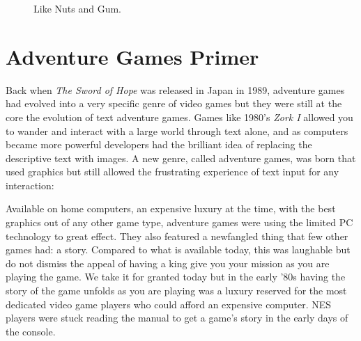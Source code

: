 \documentclass{book}
\begin{document}
\FloatBarrier\vspace{\baselineskip}\begin{figure}[H]\caption*{Like Nuts and Gum.}\end{figure}
\FloatBarrier\section*{Adventure Games Primer}
Back when \emph{The Sword of Hope} was released in Japan in 1989, adventure games had evolved into a very specific genre of video games but they were still at the core the evolution of text adventure games. Games like 1980’s \emph{Zork I} allowed you to wander and interact with a large world through text alone, and as computers became more powerful developers had the brilliant idea of replacing the descriptive text with images. A new genre, called adventure games, was born that used graphics but still allowed the frustrating experience of text input for any interaction:\par
{}\par
Available on home computers, an expensive luxury at the time, with the best graphics out of any other game type, adventure games were using the limited PC technology to great effect. They also featured a newfangled thing that few other games had: a story. Compared to what is available today, this was laughable but do not dismiss the appeal of having a king give you your mission as you are playing the game. We take it for granted today but in the early ’80s having the story of the game unfolds as you are playing was a luxury reserved for the most dedicated video game players who could afford an expensive computer. NES players were stuck reading the manual to get a game’s story in the early days of the console.\par
\end{document}
